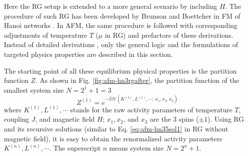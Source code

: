 Here the RG setup is extended to a more general scenario by including $H$. The procedure of such RG has been developed by Brunson and Boettcher in FM of Hanoi networks \cite{brunson2014rg}. In AFM, the same procedure is followed with corresponding adjustments of temperature $T$ ($\mu$ in RG) and prefactors of these derivations. Instead of detailed derivations \cite{brunson2014rg}, only the general logic and the formulations of targeted physics properties are described in this section. 

The starting point of all these equilibrium physical properties is the partition function $Z$. As shown in Fig. \ref{fig:afm-hn3rgafter}, the partition function of the smallest system size $N=2^1+1=3$
\begin{equation}
Z^{(1)} = e^{-\beta \mathcal{H} ( K^{(1)}, L^{(1)}, \cdots ;\  x_1, x_2, x_3)}
\end{equation}
where $K^{(1)}, L^{(1)}, \cdots$ stands for the raw activity parameters of temperature $T$, coupling $J$, and magnetic field $H$; $x_1, x_2$, and $ x_3$ are the 3 spins ($\pm 1$). 
Using RG and its recursive solutions (similar to Eq. \ref{eq:afm-hn35sol1} in RG without magnetic field), it is easy to obtain the renormalized activity parameters  $K^{(n)}, L^{(n)}, \cdots$. The superscript $n$ means system size $N=2^n + 1$. 

